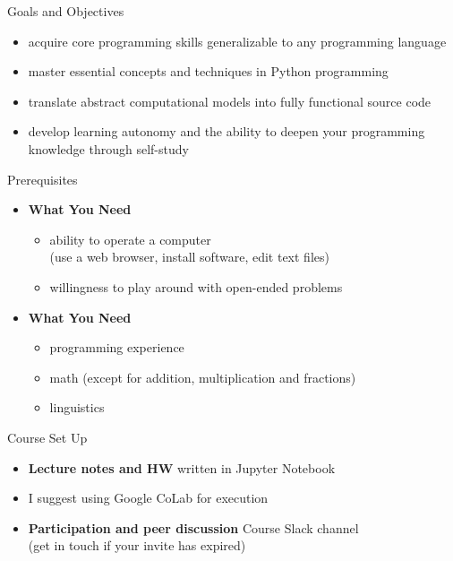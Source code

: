 \documentclass[professionalfonts, xcolor={usenames,svgnames,x11names,table}]{beamer}
\begin{document}
\begin{frame}{Goals and Objectives}
    \begin{itemize}
	\item  acquire core programming skills generalizable to any programming language
	\item master essential concepts and techniques in Python programming
	\item translate abstract computational models into fully functional source code
	\item develop learning autonomy and the ability to deepen your programming knowledge through self-study
    \end{itemize}
\end{frame}


\begin{frame}{Prerequisites}
    \begin{itemize}
        \item \textbf{What You Need}
            \begin{itemize}
                \item ability to operate a computer\\
                    (use a web browser, install software, edit text files)
                \item willingness to play around with open-ended problems
            \end{itemize}
        \item \textbf{What You  Need}
            \begin{itemize}
                \item programming experience
                \item math (except for addition, multiplication and fractions)
                \item linguistics
            \end{itemize}
    \end{itemize}
\end{frame}

\begin{frame}{Course Set Up}

\begin{itemize}
   \item \textbf{Lecture notes and HW} written in Jupyter Notebook
   \item I suggest using Google CoLab for execution
   \item \textbf{Participation and peer discussion} Course Slack channel \\ (get in touch if your invite has expired)
       \end{itemize}
\end{frame}
\end{document}
